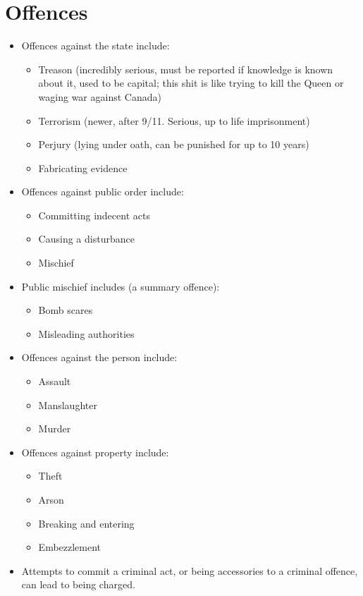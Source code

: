 \documentclass{article}
\begin{document}
\section{Offences}
\begin{itemize}
    \item Offences against the state include:
        \begin{itemize}
            \item Treason (incredibly serious, must be reported if knowledge is known about it, used to be capital; this shit is like trying to kill the Queen or waging war against Canada)
            \item Terrorism (newer, after 9/11.  Serious, up to life imprisonment)
            \item Perjury (lying under oath, can be punished for up to 10 years)
            \item Fabricating evidence
        \end{itemize}
    \item Offences against public order include:
        \begin{itemize}
            \item Committing indecent acts
            \item Causing a disturbance
            \item Mischief
        \end{itemize}
    \item Public mischief includes (a summary offence):
        \begin{itemize}
            \item Bomb scares
            \item Misleading authorities
        \end{itemize}
    \item Offences against the person include:
        \begin{itemize}
            \item Assault
            \item Manslaughter
            \item Murder
        \end{itemize}
    \item Offences against property include:
        \begin{itemize}
            \item Theft
            \item Arson
            \item Breaking and entering
            \item Embezzlement
        \end{itemize}
    \item Attempts to commit a criminal act, or being accessories to a criminal offence, can lead to being charged.
\end{itemize}
\end{document}
